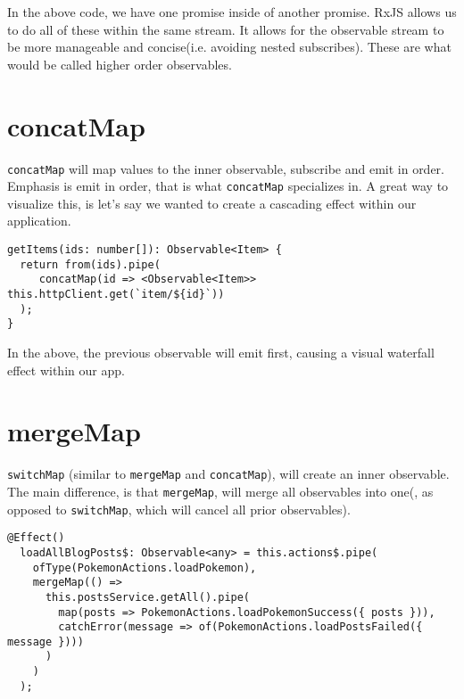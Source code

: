 In the above code, we have one promise inside of another promise. RxJS allows us
to do all of these within the same stream. It allows for the observable stream
to be more manageable and concise(i.e. avoiding nested subscribes). These are
what would be called higher order observables. 

\section{concatMap}
\lstinline{concatMap} will map values to the inner observable, subscribe and 
emit in order. Emphasis is emit in order, that is what \lstinline{concatMap} 
specializes in. A great way to visualize this, is let's say we wanted to 
create a cascading effect within our application. 

\begin{lstlisting}[caption=data-table.component.ts]
getItems(ids: number[]): Observable<Item> {
  return from(ids).pipe(
     concatMap(id => <Observable<Item>> this.httpClient.get(`item/${id}`))
  );
}
\end{lstlisting}

In the above, the previous observable will emit first, causing a visual 
waterfall effect within our app. 

\section{mergeMap}
\lstinline{switchMap} (similar to \lstinline{mergeMap} and \lstinline{concatMap}),
will create an inner observable. The main difference, is that \lstinline{mergeMap},
will merge all observables into one(, as opposed to \lstinline{switchMap}, 
which will cancel all prior observables). 

\begin{lstlisting}[caption=mergeMap example]
  @Effect()
  loadAllBlogPosts$: Observable<any> = this.actions$.pipe(
    ofType(PokemonActions.loadPokemon),
    mergeMap(() =>
      this.postsService.getAll().pipe(
        map(posts => PokemonActions.loadPokemonSuccess({ posts })),
        catchError(message => of(PokemonActions.loadPostsFailed({ message })))
      )
    )
  );  
\end{lstlisting}

